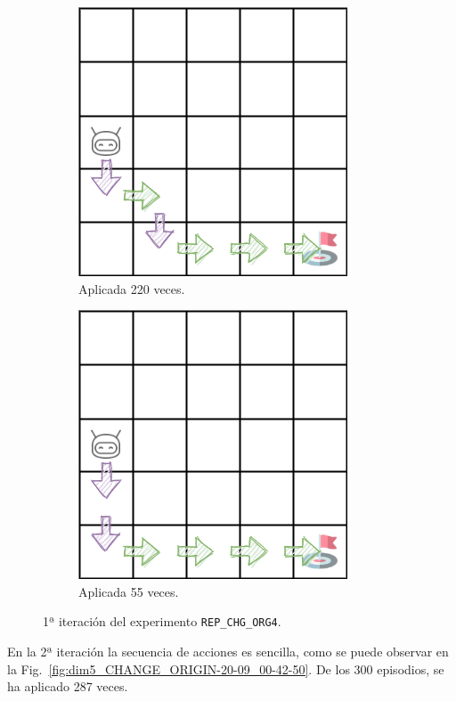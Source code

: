 \begin{figure}
    \centering
    \begin{subfigure}{.5\textwidth}
        \centering
        \includegraphics[scale=0.4]{cap5_experimentacion/images/dim5_CHANGE_ORIGIN-20_09-00_57-2, 0, 1_220.png}
        \caption{Aplicada 220 veces.}
        \label{fig:dim5_CHANGE_ORIGIN-20_09-00_57-2, 0, 1_220}
    \end{subfigure}%
    \begin{subfigure}{.5\textwidth}
        \centering
        \includegraphics[scale=0.4]{cap5_experimentacion/images/dim5_CHANGE_ORIGIN-20_09-00_57-2, 0, 1_55.png}
        \caption{Aplicada 55 veces.}
        \label{fig:dim5_CHANGE_ORIGIN-20_09-00_57-2, 0, 1_55}
    \end{subfigure}
    \caption{1ª iteración del experimento \texttt{REP\_CHG\_ORG4}.}
    \label{fig:dim5_CHANGE_ORIGIN-20_09-00_52-2, 0, 1_1iter}
\end{figure}

En la 2ª iteración la secuencia de acciones es sencilla, como se puede observar en la  Fig.~\ref{fig:dim5_CHANGE_ORIGIN-20-09_00-42-50}. De los 300 episodios, se ha aplicado 287 veces. \\

